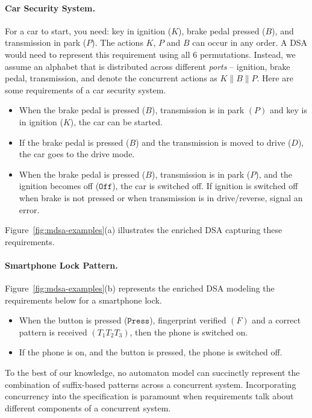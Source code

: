    \paragraph*{Car Security System.} For a car to start, you need: key in ignition ($K$), brake pedal pressed ($B$), and transmission in park ($P$). The actions $K$, $P$ and $B$ can occur in any order. A DSA would need to represent this requirement using all $6$ permutations. Instead, we assume an alphabet that is distributed across different \emph{ports} -- ignition, brake pedal, transmission, and denote the concurrent actions as $K \parallel B \parallel P$. Here are some requirements of a car security system. 

   \begin{itemize}
   \item When the brake pedal is pressed ($B$), transmission is in park $(P)$ and key is in ignition ($K$), the car can be started.
   \item If the brake pedal is pressed ($B$) and the transmission is moved to drive ($D$), the car goes to the drive mode.
   \item When the brake pedal is pressed ($B$), transmission is in park ($P$), and the ignition becomes off ($\mathtt{Off}$), the car is switched off. If ignition is switched off when brake is not pressed or when transmission is in drive/reverse, signal an error.
   \end{itemize}

   Figure~\ref{fig:mdsa-examples}(a) illustrates the enriched DSA capturing these requirements.
  
   \paragraph*{Smartphone Lock Pattern.} 
   Figure~\ref{fig:mdsa-examples}(b) represents the enriched DSA modeling the requirements below for a smartphone lock.

   \begin{itemize}
   \item When the button is pressed ($\mathtt{Press}$), fingerprint verified $(F)$ and a correct pattern is received $(T_1 T_2 T_3)$, then the phone is switched on.
   \item If the phone is on, and the button is pressed, the phone is switched off.  
   \end{itemize}
   
  To the best of our knowledge, no automaton model can succinctly represent the combination of suffix-based patterns across a concurrent system. Incorporating concurrency into the specification is paramount when requirements talk about different components of a concurrent system. 




